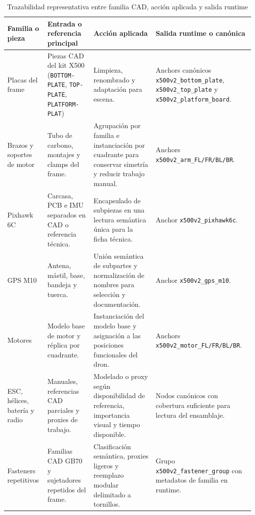 \begin{table}[H]
    \caption[Trazabilidad CAD--runtime]{Trazabilidad representativa entre familia CAD, acción aplicada y salida runtime}
    \label{tab:trazabilidad_familias_pipeline}
    \centering
    \scriptsize
    \setlength{\tabcolsep}{3pt}
    \begin{tabular}{p{3.0cm}p{3.8cm}p{4.1cm}p{4.3cm}}
        \hline
        \textbf{Familia o pieza} & \textbf{Entrada o referencia principal} & \textbf{Acción aplicada} & \textbf{Salida runtime o canónica} \\ \hline
        Placas del frame & Piezas CAD del kit X500 (\texttt{BOTTOM-PLATE}, \texttt{TOP-PLATE}, \texttt{PLATFORM-PLAT}) & Limpieza, renombrado y adaptación para escena. & Anchors canónicos \texttt{x500v2\_bottom\_plate}, \texttt{x500v2\_top\_plate} y \texttt{x500v2\_platform\_board}. \\
        Brazos y soportes de motor & Tubo de carbono, montajes y clamps del frame. & Agrupación por familia e instanciación por cuadrante para conservar simetría y reducir trabajo manual. & Anchors \texttt{x500v2\_arm\_FL/FR/BL/BR}. \\
        Pixhawk 6C & Carcasa, PCB e IMU separados en CAD o referencia técnica. & Encapsulado de subpiezas en una lectura semántica única para la ficha técnica. & Anchor \texttt{x500v2\_pixhawk6c}. \\
        GPS M10 & Antena, mástil, base, bandeja y tuerca. & Unión semántica de subpartes y normalización de nombres para selección y documentación. & Anchor \texttt{x500v2\_gps\_m10}. \\
        Motores & Modelo base de motor y réplica por cuadrante. & Instanciación del modelo base y asignación a las posiciones funcionales del dron. & Anchors \texttt{x500v2\_motor\_FL/FR/BL/BR}. \\
        ESC, hélices, batería y radio & Manuales, referencias CAD parciales y proxies de trabajo. & Modelado o proxy según disponibilidad de referencia, importancia visual y tiempo disponible. & Nodos canónicos con cobertura suficiente para lectura del ensamblaje. \\
        Fasteners repetitivos & Familias CAD GB70 y sujetadores repetidos del frame. & Clasificación semántica, proxies ligeros y reemplazo modular delimitado a tornillos. & Grupo \texttt{x500v2\_fastener\_group} con metadatos de familia en runtime. \\ \hline
    \end{tabular}
    \par\vspace{0.5\baselineskip}
\end{table}

